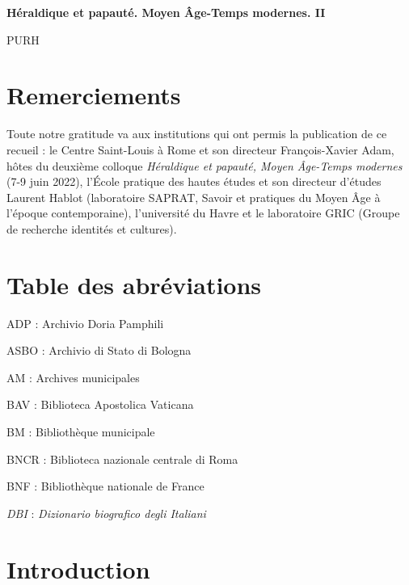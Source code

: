 \documentclass[12pt,twoside,openany]{book}
\title{\PURHBookTitle}
\author{\PURHBookAuthor}
\date{\PURHYear}
\newcommand{\PurhTitleExtra}[1]{%
  {\small #1\par}%
}
\begin{document}
\begin{titlepage}
\thispagestyle{empty}
\centering
\vspace*{0.15\textheight}
{\Huge\bfseries Héraldique et papauté. Moyen Âge-Temps modernes. II\par}
\vfill
\PurhTitleExtra{PURH}
\end{titlepage}
\clearpage

\frontmatter

\mainmatter

\chapter*{Remerciements}

Toute notre gratitude va aux institutions qui ont permis la publication de ce recueil : le Centre Saint-Louis à Rome et son directeur François-Xavier Adam, hôtes du deuxième colloque \textit{Héraldique et papauté, Moyen Âge-Temps modernes} (7-9 juin 2022), l’École pratique des hautes études et son directeur d’études Laurent Hablot (laboratoire SAPRAT, Savoir et pratiques du Moyen Âge à l'époque contemporaine), l’université du Havre et le laboratoire GRIC (Groupe de recherche identités et cultures).

\chapter*{Table des abréviations}

ADP : Archivio Doria Pamphili

ASBO : Archivio di Stato di Bologna

AM : Archives municipales

BAV : Biblioteca Apostolica Vaticana

BM : Bibliothèque municipale

BNCR : Biblioteca nazionale centrale di Roma

BNF : Bibliothèque nationale de France

\textit{DBI} : \textit{Dizionario biografico degli Italiani}

\chapter*{Introduction}
\end{document}
